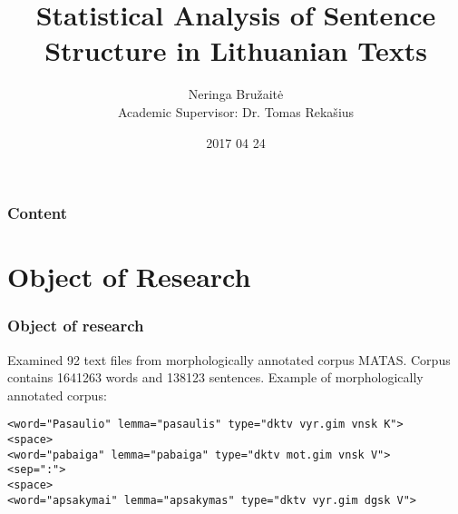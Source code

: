\documentclass{beamer}
\institute[]{
Vilnius Gediminas Technical University
}
\title[]
{\centering  
Statistical Analysis of Sentence Structure in Lithuanian Texts
}
\author[Neringa Bružaitė, Tomas Rekašius]
{ 
 Neringa Bružaitė \bigskip \\  \small 
 Academic Supervisor: Dr. Tomas Rekašius \vspace{5mm}
}
\date{ \tiny 2017 04 24}
\begin{document}
\begin{frame}
\titlepage %
\end{frame}

\begin{frame}
\frametitle{Content} 
\tableofcontents 
\end{frame}


\section{Object of Research} 



\begin{frame}[fragile]
\frametitle{Object of research}
%
Examined \alert{92} text files from morphologically annotated corpus MATAS.
\smallskip
Corpus contains \alert{1641263} words and \alert{138123} sentences.
%
\bigskip
%
Example of morphologically annotated corpus:
%
\begin{Verbatim}[frame=single, fontsize=\small]
<word="Pasaulio" lemma="pasaulis" type="dktv vyr.gim vnsk K">
<space>
<word="pabaiga" lemma="pabaiga" type="dktv mot.gim vnsk V">
<sep=":">
<space>
<word="apsakymai" lemma="apsakymas" type="dktv vyr.gim dgsk V">
\end{Verbatim}
%
\end{frame}

\end{document}

